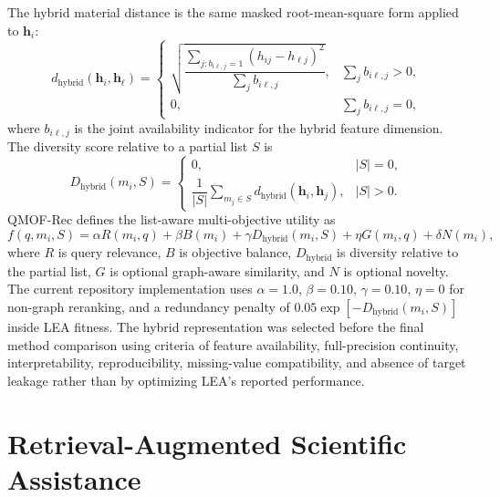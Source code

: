 \documentclass[12pt,a4paper]{article}
\begin{document}
The hybrid material distance is the same masked root-mean-square form applied to $\mathbf{h}_i$:
\begin{equation}
  d_{\mathrm{hybrid}}(\mathbf{h}_i,\mathbf{h}_\ell)=
  \begin{cases}
  \sqrt{\dfrac{\sum_{j:b_{i\ell,j}=1}(h_{ij}-h_{\ell j})^2}{\sum_j b_{i\ell,j}}}, & \sum_j b_{i\ell,j}>0,\\[8pt]
  0, & \sum_j b_{i\ell,j}=0,
  \end{cases}
\end{equation}
where $b_{i\ell,j}$ is the joint availability indicator for the hybrid feature dimension. The diversity score relative to a partial list $S$ is
\begin{equation}
  D_{\mathrm{hybrid}}(m_i,S)=
  \begin{cases}
  0, & |S|=0,\\[4pt]
  \dfrac{1}{|S|}\displaystyle\sum_{m_j\in S}d_{\mathrm{hybrid}}(\mathbf{h}_i,\mathbf{h}_j), & |S|>0.
  \end{cases}
\end{equation}
QMOF-Rec defines the list-aware multi-objective utility as
\begin{equation}
  f(q,m_i,S) = \alpha R(m_i,q) + \beta B(m_i) + \gamma D_{\mathrm{hybrid}}(m_i,S) + \eta G(m_i,q) + \delta N(m_i),
  \label{eq:utility}
\end{equation}
where $R$ is query relevance, $B$ is objective balance, $D_{\mathrm{hybrid}}$ is diversity relative to the partial list, $G$ is optional graph-aware similarity, and $N$ is optional novelty. The current repository implementation uses $\alpha=1.0$, $\beta=0.10$, $\gamma=0.10$, $\eta=0$ for non-graph reranking, and a redundancy penalty of $0.05\exp[-D_{\mathrm{hybrid}}(m_i,S)]$ inside LEA fitness. The hybrid representation was selected before the final method comparison using criteria of feature availability, full-precision continuity, interpretability, reproducibility, missing-value compatibility, and absence of target leakage rather than by optimizing LEA's reported performance.

\section{Retrieval-Augmented Scientific Assistance}
\label{sec:rag_form}
\end{document}
